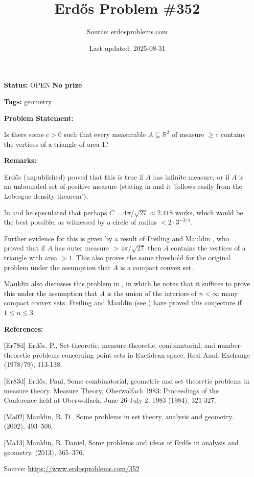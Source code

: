 \documentclass{article}
\title{Erd\H{o}s Problem \#352}
\date{Last updated: 2025-08-31}
\author{Source: erdosproblems.com}
\begin{document}
\maketitle

\noindent\textbf{Status:} OPEN \quad \textbf{No prize}

\noindent\textbf{Tags:} geometry

\medskip
\noindent\textbf{Problem Statement:}

Is there some $c>0$ such that every measurable $A\subseteq \mathbb{R}^2$ of measure $\geq c$ contains the vertices of a triangle of area 1?

\bigskip
\noindent\textbf{Remarks:}

Erd\H{o}s (unpublished) proved that this is true if $A$ has infinite measure, or if $A$ is an unbounded set of positive measure (stating in \cite{Er78d} and \cite{Er83d} it 'follows easily from the Lebesgue density theorem'). 

In \cite{Er78d} and \cite{Er83d} he speculated that perhaps $C=4\pi/\sqrt{27}\approx 2.418$ works, which would be the best possible, as witnessed by a circle of radius $<2\cdot 3^{-3/4}$.

Further evidence for this is given by a result of Freiling and Mauldin \cite{Ma02}, who proved that if $A$ has outer measure $>4\pi/\sqrt{27}$ then $A$ contains the vertices of a triangle with area $>1$. This also proves the same threshold for the original problem under the assumption that $A$ is a compact convex set. 

Mauldin also discusses this problem in \cite{Ma13}, in which he notes that it suffices to prove this under the assumption that $A$ is the union of the interiors of $n<\infty$ many compact convex sets. Freiling and Mauldin (see \cite{Ma13}) have proved this conjecture if $1\leq n\leq 3$.

\bigskip
\noindent\textbf{References:}

[Er78d] Erd\H{o}s, P., Set-theoretic, measure-theoretic, combinatorial, and
number-theoretic problems concerning point sets in Euclidean
space. Real Anal. Exchange (1978/79), 113-138.
 
 [Er83d] Erd\H{o}s, Paul, Some combinatorial, geometric and set theoretic problems in measure theory. Measure Theory, Oberwolfach 1983: Proceedings of the Conference held at Oberwolfach, June 26-July 2, 1983 (1984), 321-327.
 
 [Ma02] Mauldin, R. D., Some problems in set theory, analysis and geometry. (2002), 493--506.
 
 [Ma13] Mauldin, R. Daniel, Some problems and ideas of {E}rd\H{o}s in analysis and geometry. (2013), 365--376.

\bigskip
\noindent\small{Source: \url{https://www.erdosproblems.com/352}}
\end{document}
